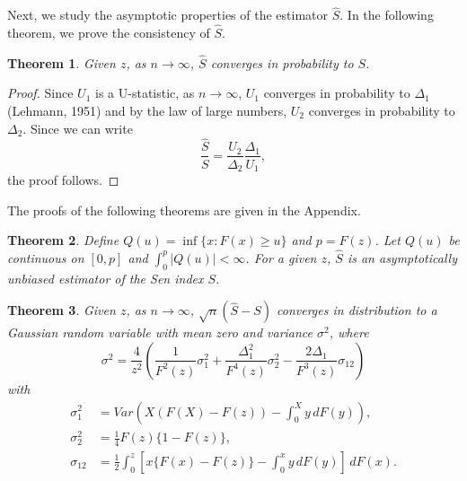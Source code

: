 \documentclass[11pt]{article}
\newtheorem{theorem}{Theorem}
\begin{document}
\par  Next, we study the asymptotic properties of the estimator $ \widehat{S}$.  In the following theorem, we prove the consistency of $\widehat{S}$.
 \begin{theorem}
   Given $z$, as $n\rightarrow \infty$, $\widehat{S}$ converges in probability to $S$.
 \end{theorem}
\begin{proof}
    Since $U_1$ is a U-statistic, as $n\rightarrow\infty$, $U_1$ converges in probability to $\Delta_1$ (Lehmann, 1951) and by the law of large numbers, $U_2$ converges in probability to $\Delta_2.$  Since we can write
\begin{equation}
 \frac{\widehat{S}}{S}=\frac{U_2}{\Delta_2}\frac{\Delta_1}{U_1},
 \end{equation}the proof follows.
\end{proof}
\noindent The proofs of the following theorems are given in the Appendix.
\begin{theorem}Define $Q(u)=\inf\{x:F(x)\ge u\}$ and $p=F(z)$.  Let $Q(u)$ be continuous on $[0,p]$ and $ \int_0^{p} |Q(u)| < \infty$. For a given $z$, $\widehat{S}$ is an asymptotically unbiased estimator of the Sen index $S$.
\end{theorem}

\begin{theorem}\label{thm_sen2}
Given $z$, as $n\to\infty$, $\sqrt{n}(\widehat S-S)$ converges in distribution to a Gaussian random variable with mean zero and variance $\sigma^2$, where
$$
\sigma^2
=
\frac{4}{z^2}
\left(
\frac{1}{F^2(z)}\sigma_1^2
+
\frac{\Delta_1^2}{F^4(z)}\sigma_2^2
-
\frac{2\Delta_1}{F^3(z)}\sigma_{12}
\right)
$$
with
\begin{align*}
\sigma_1^2
&=
Var\!\left(
X(F(X)-F(z))-\int_0^X y\,dF(y)
\right),\\[0.5em]
\sigma_2^2
&=
\frac14 F(z)\{1-F(z)\},\\[0.5em]
\sigma_{12}
&=
\frac12
\int_0^z
\left[
x\{F(x)-F(z)\}
-
\int_0^x y\,dF(y)
\right]
\,dF(x).
\end{align*}
\end{theorem}
\end{document}
